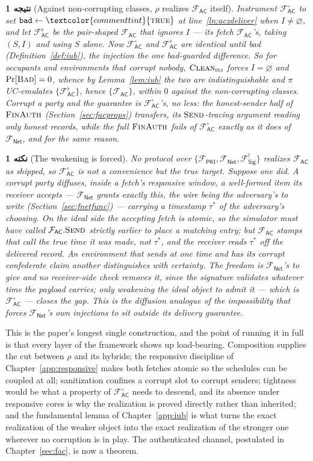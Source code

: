 \documentclass[10pt,oneside,openany]{book}
\renewcommand{\emptyset}{\varnothing}
\newcommand{\op}[1]{\textnormal{\textsc{#1}}}
\newcommand{\atom}[1]{\textcolor{commenttint}{\op{#1}}}
\newcommand{\true}{\atom{true}}
\newcommand{\Bad}{\op{Bad}}
\newcommand{\Fsig}{\mathcal{F}_{\mathsf{Sig}}}
\newcommand{\Fnet}{\mathcal{F}_{\mathsf{Net}}}
\newcommand{\Fac}{\mathcal{F}_{\mathsf{AC}}}
\newcommand{\Facz}{\mathcal{F}^{\circ}_{\mathsf{AC}}}
\newcommand{\Fpki}{\mathcal{F}_{\mathsf{PKI}}}
\newcommand{\Clean}{\op{Clean}}
\newcommand{\V}[1]{\mathtt{#1}}
\theoremstyle{accentdef}
\newtheorem{remark}[definition]{نکته}
\theoremstyle{accentplain}
\newtheorem{corollary}[definition]{نتیجه}
\begin{document}
\begin{corollary}[Against non-corrupting classes, $\rho$ realizes $\Fac$ itself]\label{cor:realac}
Instrument $\Facz$ to set $\V{bad} \gets \true$ at line~\ref{ln:aczdeliver} when $I \neq
\emptyset$, and let $\Fac^{\flat}$ be the pair-shaped $\Fac$ that ignores $I$ --- its fetch
$\Fac$'s, taking $(S,I)$ and using $S$ alone. Now $\Facz$ and $\Fac^{\flat}$ are identical until bad
(Definition~\ref{def:iub}), the injection the one bad-guarded difference. So for occupants and
environments that corrupt nobody, $\Clean_{\op{inj}}$ forces $I = \emptyset$ and $\Pr[\Bad] = 0$,
whence by Lemma~\ref{lem:iub} the two are indistinguishable and $\pi$ UC-emulates
$\{\Fac^{\flat}\}$, hence $\{\Fac\}$, within $0$ against the non-corrupting classes. Corrupt a
party and the guarantee is $\Facz$'s, no less: the honest-sender half of $\op{FinAuth}$
(Section~\ref{sec:facprops}) transfers, its $\op{Send}$-tracing argument reading only honest
records, while the full $\op{FinAuth}$ fails of $\Facz$ exactly as it does of $\Fnet$, and for the
same reason.
\end{corollary}

\begin{remark}[The weakening is forced]\label{rem:acimposs}
No protocol over $\{\Fpki,\Fnet,\Fsig^{!}\}$ realizes $\Fac$ as shipped, so $\Facz$ is not a
convenience but the true target. Suppose one did. A corrupt party diffuses, inside a fetch's
responsive window, a well-formed item its receiver accepts --- $\Fnet$ grants exactly this, the
wire being the adversary's to write (Section~\ref{sec:fnetfunc}) --- carrying a timestamp
$\tau^{*}$ of the adversary's choosing. On the ideal side the accepting fetch is atomic, so the
simulator must have called $\Fac.\op{Send}$ strictly earlier to place a matching entry; but $\Fac$
stamps that call the true time it was made, not $\tau^{*}$, and the receiver reads $\tau^{*}$ off
the delivered record. An environment that sends at one time and has its corrupt confederate claim
another distinguishes with certainty. The freedom is $\Fnet$'s to give and no receiver-side check
removes it, since the signature validates whatever time the payload carries; only weakening the
ideal object to admit it --- which is $\Facz$ --- closes the gap. This is the diffusion analogue
of the impossibility that forces $\Fnet$'s own injections to sit outside its delivery guarantee.
\end{remark}

This is the paper's longest single construction, and the point of running it in full is that
every layer of the framework shows up load-bearing. Composition supplies the cut between $\rho$
and its hybrids; the responsive discipline of Chapter~\ref{app:responsive} makes both fetches
atomic so the schedules can be coupled at all; sanitization confines a corrupt slot to corrupt
senders; tightness would be what a property of $\Facz$ needs to descend, and its absence under
responsive cores is why the realization is proved directly rather than inherited; and the
fundamental lemma of Chapter~\ref{app:iub} is what turns the exact realization of the weaker
object into the exact realization of the stronger one wherever no corruption is in play. The
authenticated channel, postulated in Chapter~\ref{sec:fac}, is now a theorem.
\end{document}
